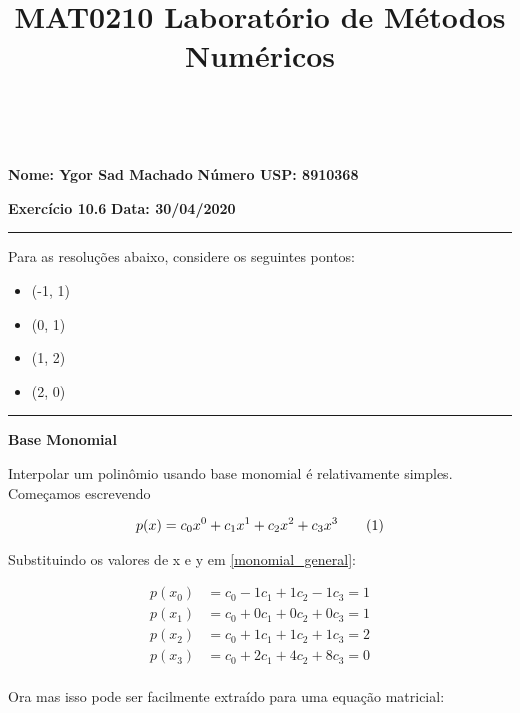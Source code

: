 \documentclass[9.5pt,reqno,a4paper]{amsart}
\newcommand\numberthis{\addtocounter{equation}{1}\tag{\theequation}}
\begin{document}
\parindent=0pt

\title[MAT0210]
{MAT0210 Laboratório de Métodos Numéricos}\\\vspace{3\jot}%

\footskip=28pt

\maketitle
\thispagestyle{empty} 
\pagestyle{plain}
\onehalfspace

\textbf{Nome: Ygor Sad Machado}\hfill
\textbf{Número USP: 8910368}\null

\medskip
\textbf{Exercício 10.6}\hfill
\textbf{Data: 30/04/2020}\null

\noindent\rule{\textwidth}{0.4pt}
Para as resoluções abaixo, considere os seguintes pontos:

\begin{itemize}
    \item (-1, 1)
    \item (0, 1)
    \item (1, 2)
    \item (2, 0)
\end{itemize}

\noindent\rule{\textwidth}{0.4pt}
\textbf{Base Monomial}

Interpolar um polinômio usando base monomial é relativamente simples. Começamos escrevendo 

\begin{align*}
    p(x) = c_0x^0 + c_1x^1 + c_2x^2 + c_3x^3 \numberthis \label{monomial_general}
\end{align*}

\bigskip
Substituindo os valores de x e y em \eqref{monomial_general}:

\begin{align*}
    p(x_0) &= c_0 - 1c_1 + 1c_2 - 1c_3 = 1\\
    p(x_1) &= c_0 + 0c_1 + 0c_2 + 0c_3 = 1\\
    p(x_2) &= c_0 + 1c_1 + 1c_2 + 1c_3 = 2\\
    p(x_3) &= c_0 + 2c_1 + 4c_2 + 8c_3 = 0\\
\end{align*}

\bigskip
Ora mas isso pode ser facilmente extraído para uma equação matricial:
\end{document}
